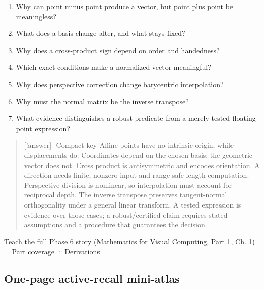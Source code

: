 \hypertarget{appendix-38d9c8aca357-retrieval-prompts}{}

\begin{enumerate}
\def\labelenumi{\arabic{enumi}.}
\tightlist
\item
  Why can point minus point produce a vector, but point plus point be meaningless?
\item
  What does a basis change alter, and what stays fixed?
\item
  Why does a cross-product sign depend on order and handedness?
\item
  Which exact conditions make a normalized vector meaningful?
\item
  Why does perspective correction change barycentric interpolation?
\item
  Why must the normal matrix be the inverse transpose?
\item
  What evidence distinguishes a robust predicate from a merely tested floating-point expression?
\end{enumerate}

\begin{quote}
{[}!answer{]}- Compact key Affine points have no intrinsic origin, while displacements do. Coordinates depend on the chosen basis; the geometric vector does not. Cross product is antisymmetric and encodes orientation. A direction needs finite, nonzero input and range-safe length computation. Perspective division is nonlinear, so interpolation must account for reciprocal depth. The inverse transpose preserves tangent-normal orthogonality under a general linear transform. A tested expression is evidence over those cases; a robust/certified claim requires stated assumptions and a procedure that guarantees the decision.
\end{quote}

\href{../02-Mathematics-for-Visual-Computing-P01/main.pdf\#nameddest=01-foundations-i-ch017-the-panel-gives-us-a-reason-to-learn}{Teach the full Phase 6 story (Mathematics for Visual Computing, Part 1, Ch. 1)} · \hyperref[appendix-fd090d982a15-phase-6---parts-501-600]{Part coverage} · \hyperref[02-foundations-ii-ch039-phase-6---geometry-reconstruction-proofs]{Derivations}

\subsection{One-page active-recall mini-atlas}\label{appendix-38d9c8aca357-one-page-active-recall-mini-atlas}

